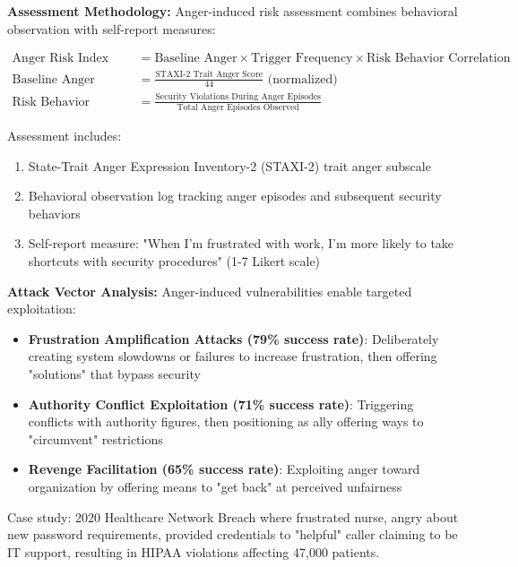 \documentclass[11pt,a4paper]{article}
\begin{document}
\textbf{Assessment Methodology:}
Anger-induced risk assessment combines behavioral observation with self-report measures:

\begin{align}
\text{Anger Risk Index} &= \text{Baseline Anger} \times \text{Trigger Frequency} \times \text{Risk Behavior Correlation} \\
\text{Baseline Anger} &= \frac{\text{STAXI-2 Trait Anger Score}}{44} \text{ (normalized)} \\
\text{Risk Behavior Correlation} &= \frac{\text{Security Violations During Anger Episodes}}{\text{Total Anger Episodes Observed}}
\end{align}

Assessment includes:
\begin{enumerate}
\item State-Trait Anger Expression Inventory-2 (STAXI-2) trait anger subscale
\item Behavioral observation log tracking anger episodes and subsequent security behaviors
\item Self-report measure: "When I'm frustrated with work, I'm more likely to take shortcuts with security procedures" (1-7 Likert scale)
\end{enumerate}

\textbf{Attack Vector Analysis:}
Anger-induced vulnerabilities enable targeted exploitation:
\begin{itemize}
\item \textbf{Frustration Amplification Attacks (79\% success rate)}: Deliberately creating system slowdowns or failures to increase frustration, then offering "solutions" that bypass security
\item \textbf{Authority Conflict Exploitation (71\% success rate)}: Triggering conflicts with authority figures, then positioning as ally offering ways to "circumvent" restrictions
\item \textbf{Revenge Facilitation (65\% success rate)}: Exploiting anger toward organization by offering means to "get back" at perceived unfairness
\end{itemize}

Case study: 2020 Healthcare Network Breach where frustrated nurse, angry about new password requirements, provided credentials to "helpful" caller claiming to be IT support, resulting in HIPAA violations affecting 47,000 patients.
\end{document}
